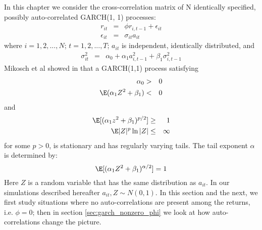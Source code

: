 
In this chapter we consider the cross-correlation matrix of N
identically specified, possibly auto-correlated GARCH(1, 1)
processes:
\begin{eqnarray}
  r_{it} &=& \phi r_{i, t-1} + \epsilon_{it} \nonumber \\
  \epsilon_{it} &=& \sigma_{it} a_{it} \label{eq:garch_spec}
\end{eqnarray}
where $i=1,2,...,N$; $t=1,2,...,T$; $a_{it}$ is independent,
identically distributed, and
\begin{eqnarray*}
  \sigma_{it}^2 &=& \alpha_0 + \alpha_1 a_{i, t-1}^2 + \beta_1
  \sigma_{i,t-1}^2
\end{eqnarray*}
Mikosch et al showed in \cite{mikosch2000} that a GARCH(1,1) process
satisfying
\begin{eqnarray*}
  \alpha_0 &>& 0 \\
  \E(\alpha_1 Z^2 + \beta_1) &<& 0 \\
\end{eqnarray*}
and
\begin{eqnarray*}
  \E[(\alpha_1 z^2 + \beta_1)^{p/2}] &\geq& 1 \\
  \E|Z|^p \ln|Z| &\leq& \infty
\end{eqnarray*}
for some $p > 0$, is stationary and has regularly varying tails. The
tail exponent $\alpha$ is determined by:
\begin{equation}\label{eq:garch_alpha}
  \E[(\alpha_1 Z^2 + \beta_1)^{\alpha/2}] = 1
\end{equation}
Here $Z$ is a random variable that has the same distribution as
$a_{it}$. In our simulations described hereafter $a_{it}, Z \sim N(0,
1)$. In this section and the next, we first study situations where no
auto-correlations are present among the returns, i.e. $\phi = 0$; then
in section \ref{sec:garch_nonzero_phi} we look at how auto-correlations
change the picture.

